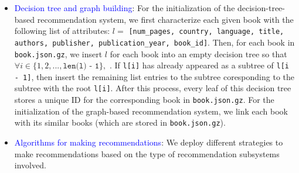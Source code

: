 \documentclass[fontsize=11pt]{article}
\begin{document}
\begin{itemize}
\begin{itemize}
    \item \textcolor{blue}{Decision tree and graph building}:
        For the initialization of the decision-tree-based recommendation system, we first characterize each given book with the following list of attributes: $l = $ \texttt{[num\_pages, country, language, title, authors, publisher, publication\_year, book\_id]}. Then, for each book in \\\texttt{book.json.gz}, we insert $l$ for each book into an empty decision tree so that $\forall i \in \{1, 2, ..., \texttt{len(l) - 1}\},$ . If \texttt{l[i]} has already appeared as a subtree of \texttt{l[i - 1]}, then insert the remaining list entries to the subtree coresponding to the subtree with the root \texttt{l[i]}. After this process, every leaf of this decision tree stores a unique ID for the corresponding book in \texttt{book.json.gz}.
        For the initialization of the graph-based recommendation system, we link each book with its similar books (which are stored in \texttt{book.json.gz}).
    \item \textcolor{blue}{Algorithms for making recommendations}: We deploy different strategies to make recommendations based on the type of recommendation subsystems involved.


\end{itemize}
\end{itemize}
\end{document}
